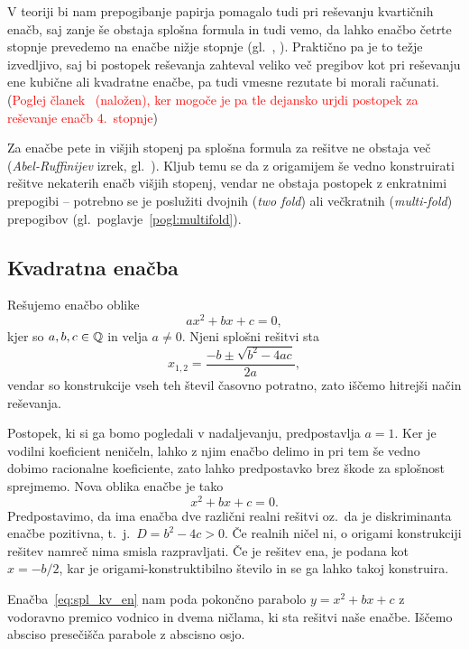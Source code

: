 V teoriji bi nam prepogibanje papirja pomagalo tudi pri reševanju kvartičnih enačb, saj zanje še obstaja splošna formula in tudi vemo, da lahko enačbo četrte stopnje prevedemo na enačbe nižje stopnje (gl.\ \cite{wikiquartic}, \cite{quartics2012}). Praktično pa je to težje izvedljivo, saj bi postopek reševanja zahteval veliko več pregibov kot pri reševanju ene kubične ali kvadratne enačbe, pa tudi vmesne rezutate bi morali računati. (\textcolor{red}{Poglej članek~\cite{edwards2001} (naložen), ker mogoče je pa tle dejansko urjdi postopek za reševanje enačb 4.\ stopnje})

Za enačbe pete in višjih stopenj pa splošna formula za rešitve ne obstaja več (\emph{Abel-Ruffinijev} izrek, gl.\ \cite{mrinal2019}). Kljub temu se da z origamijem še vedno konstruirati rešitve nekaterih enačb višjih stopenj, vendar ne obstaja postopek z enkratnimi prepogibi -- potrebno se je poslužiti dvojnih (\emph{two fold}) ali večkratnih (\emph{multi-fold}) prepogibov (gl.\ poglavje~\ref{pogl:multifold}).

\subsection{Kvadratna enačba}
\label{podpogl:kvadratna_enacba}

Rešujemo enačbo oblike
$$ a x^2 + b x + c = 0, $$
kjer so $a, b, c \in \mathbb Q$ in velja $a \neq 0$.  Njeni splošni rešitvi sta
$$ x_{1,2} = \frac{-b \pm \sqrt{b^2 - 4ac}}{2a},$$ vendar so konstrukcije vseh teh števil časovno potratno, zato iščemo hitrejši način reševanja.

Postopek, ki si ga bomo pogledali v nadaljevanju, predpostavlja $a = 1$. Ker je vodilni koeficient neničeln, lahko z njim enačbo delimo in pri tem še vedno dobimo racionalne koeficiente, zato lahko predpostavko brez škode za splošnost sprejmemo. Nova oblika enačbe je tako
\begin{equation}
    \label{eq:spl_kv_en}
    x^2 + bx + c = 0.
\end{equation}
Predpostavimo, da ima enačba dve različni realni rešitvi oz.\ da je diskriminanta enačbe pozitivna, t.\ j.\ $D = b^2 - 4c > 0$. Če realnih ničel ni, o origami konstrukciji rešitev namreč nima smisla razpravljati. Če je rešitev ena, je podana kot $x = -b/2$, kar je origami-konstruktibilno število in se ga lahko takoj konstruira.

Enačba~\ref{eq:spl_kv_en} nam poda pokončno parabolo $y = x^2 + bx + c$ z vodoravno premico vodnico in dvema ničlama, ki sta rešitvi naše enačbe. Iščemo absciso presečišča parabole z abscisno osjo.

